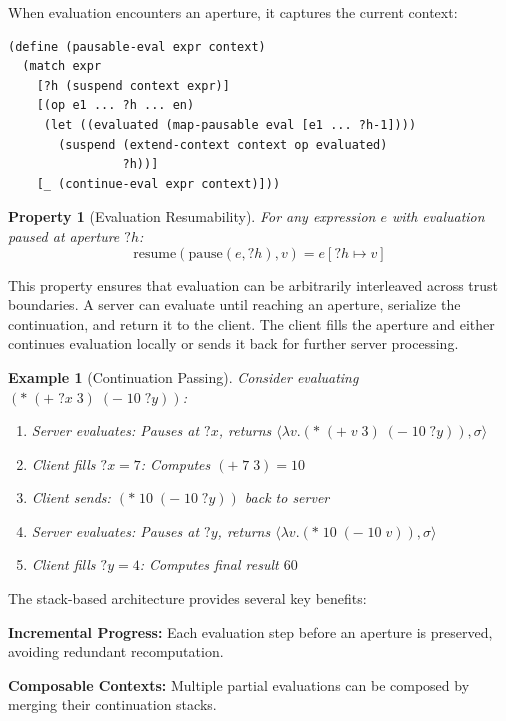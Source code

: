 \documentclass[12pt]{article}
\newtheorem{property}[theorem]{Property}
\newtheorem{example}[theorem]{Example}
\begin{document}
When evaluation encounters an aperture, it captures the current context:

\begin{lstlisting}
(define (pausable-eval expr context)
  (match expr
    [?h (suspend context expr)]
    [(op e1 ... ?h ... en)
     (let ((evaluated (map-pausable eval [e1 ... ?h-1])))
       (suspend (extend-context context op evaluated) 
                ?h))]
    [_ (continue-eval expr context)]))
\end{lstlisting}

\begin{property}[Evaluation Resumability]
For any expression $e$ with evaluation paused at aperture $?h$:
$$\text{resume}(\text{pause}(e, ?h), v) = e[?h \mapsto v]$$
\end{property}

This property ensures that evaluation can be arbitrarily interleaved across trust boundaries. A server can evaluate until reaching an aperture, serialize the continuation, and return it to the client. The client fills the aperture and either continues evaluation locally or sends it back for further server processing.

\begin{example}[Continuation Passing]
Consider evaluating $(* \; (+ \; ?x \; 3) \; (- \; 10 \; ?y))$:

\begin{enumerate}
    \item Server evaluates: Pauses at $?x$, returns $\langle \lambda v.(* \; (+ \; v \; 3) \; (- \; 10 \; ?y)), \sigma \rangle$
    \item Client fills $?x = 7$: Computes $(+ \; 7 \; 3) = 10$
    \item Client sends: $(* \; 10 \; (- \; 10 \; ?y))$ back to server
    \item Server evaluates: Pauses at $?y$, returns $\langle \lambda v.(* \; 10 \; (- \; 10 \; v)), \sigma \rangle$
    \item Client fills $?y = 4$: Computes final result $60$
\end{enumerate}
\end{example}

The stack-based architecture provides several key benefits:

\textbf{Incremental Progress:} Each evaluation step before an aperture is preserved, avoiding redundant recomputation.

\textbf{Composable Contexts:} Multiple partial evaluations can be composed by merging their continuation stacks.
\end{document}
